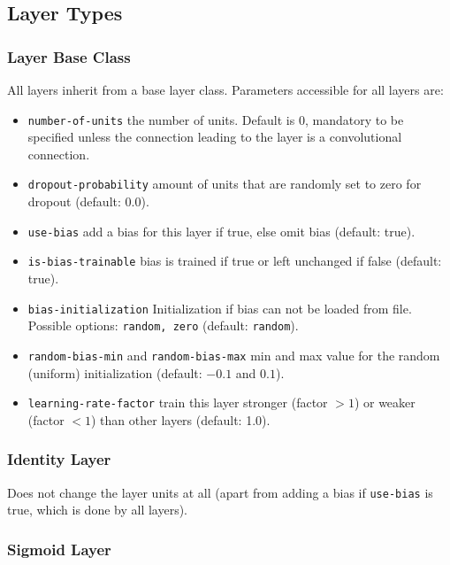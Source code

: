 \subsection{Layer Types}

\subsubsection*{Layer Base Class}

All layers inherit from a base layer class. Parameters accessible for all layers are:
\begin{itemize}
    \item \texttt{number-of-units} the number of units. Default is $ 0 $, mandatory to be specified unless the connection leading to the layer is a convolutional connection.
    \item \texttt{dropout-probability} amount of units that are randomly set to zero for dropout (default: 0.0).
    \item \texttt{use-bias} add a bias for this layer if true, else omit bias (default: true).
    \item \texttt{is-bias-trainable} bias is trained if true or left unchanged if false (default: true).
    \item \texttt{bias-initialization} Initialization if bias can not be loaded from file. Possible options: \texttt{random, zero} (default: \texttt{random}).
    \item \texttt{random-bias-min} and \texttt{random-bias-max} min and max value for the random (uniform) initialization (default: $ -0.1 $ and $ 0.1 $).
    \item \texttt{learning-rate-factor} train this layer stronger (factor $ > 1 $) or weaker (factor $ < 1 $) than other layers (default: 1.0).
\end{itemize}

\subsubsection*{Identity Layer}

Does not change the layer units at all (apart from adding a bias if \texttt{use-bias} is true, which is done by all layers).

\subsubsection*{Sigmoid Layer}

